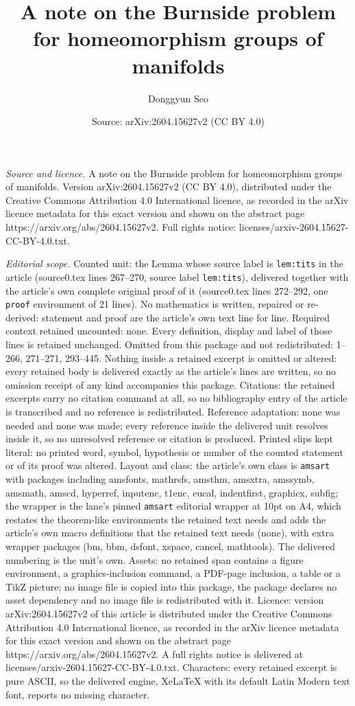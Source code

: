 \documentclass[10pt,a4paper]{amsart}
\title[A note on the Burnside problem for homeomorphism groups of m]{A note on the Burnside problem for homeomorphism groups of manifolds}
\author{Donggyun Seo}
\date{Source: arXiv:2604.15627v2 (CC BY 4.0)}
\begin{document}
\maketitle

\noindent\emph{Source and licence.} A note on the Burnside problem for homeomorphism groups of manifolds. Version arXiv:2604.15627v2 (CC BY 4.0), distributed under the Creative Commons Attribution 4.0 International licence, as recorded in the arXiv licence metadata for this exact version and shown on the abstract page https://arxiv.org/abs/2604.15627v2. Full rights notice: licenses/arxiv-2604.15627-CC-BY-4.0.txt.\par\smallskip

\noindent\textit{Editorial scope.} Counted unit: the Lemma whose source label is \texttt{lem:tits} in the article (source0.tex lines 267--270, source label \texttt{lem:tits}), delivered together with the article's own complete original proof of it (source0.tex lines 272--292, one \texttt{proof} environment of 21 lines). No mathematics is written, repaired or re-derived: statement and proof are the article's own text line for line. Required context retained uncounted: none. Every definition, display and label of those lines is retained unchanged. Omitted from this package and not redistributed: 1--266, 271--271, 293--445. Nothing inside a retained excerpt is omitted or altered: every retained body is delivered exactly as the article's lines are written, so no omission receipt of any kind accompanies this package. Citations: the retained excerpts carry no citation command at all, so no bibliography entry of the article is transcribed and no reference is redistributed. Reference adaptation: none was needed and none was made; every reference inside the delivered unit resolves inside it, so no unresolved reference or citation is produced. Printed slips kept literal: no printed word, symbol, hypothesis or number of the counted statement or of its proof was altered. Layout and class: the article's own class is \texttt{amsart} with packages including amsfonts, mathrsfs, amsthm, amsxtra, amssymb, amsmath, amscd, hyperref, inputenc, t1enc, eucal, indentfirst, graphicx, subfig; the wrapper is the lane's pinned \texttt{amsart} editorial wrapper at 10pt on A4, which restates the theorem-like environments the retained text needs and adds the article's own macro definitions that the retained text needs (none), with extra wrapper packages (bm, bbm, dsfont, xspace, cancel, mathtools). The delivered numbering is the unit's own. Assets: no retained span contains a figure environment, a graphics-inclusion command, a PDF-page inclusion, a table or a TikZ picture; no image file is copied into this package, the package declares no asset dependency and no image file is redistributed with it. Licence: version arXiv:2604.15627v2 of this article is distributed under the Creative Commons Attribution 4.0 International licence, as recorded in the arXiv licence metadata for this exact version and shown on the abstract page https://arxiv.org/abs/2604.15627v2. A full rights notice is delivered at licenses/arxiv-2604.15627-CC-BY-4.0.txt. Characters: every retained excerpt is pure ASCII, so the delivered engine, XeLaTeX with its default Latin Modern text font, reports no missing character.
\end{document}
